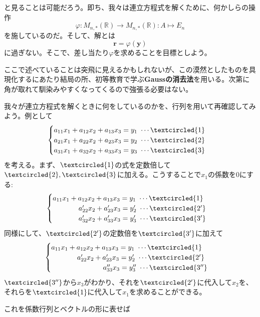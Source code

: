 \documentclass[dvipdfmx]{jsarticle}
\begin{document}
と見ることは可能だろう。即ち、我々は連立方程式を解くために、何かしらの操作
\[\varphi:M_{n,\ast}(\mathbb{R}) \to M_{n,\ast}(\mathbb{R}):A \mapsto E_n\]
を施しているのだ。そして、解とは
\[\bm{r}=\varphi(\bm{y})\]
に過ぎない。そこで、差し当たり$\varphi$を求めることを目標としよう。\par
ここで述べていることは突飛に見えるかもしれないが、この漠然としたものを具現化するにあたり結局の所、初等教育で学ぶ\textbf{Gaussの消去法}を用いる。次第に角が取れて馴染みやすくなってくるので強張る必要はない。\par
我々が連立方程式を解くときに何をしているのかを、行列を用いて再確認してみよう。例として
\[\begin{cases}a_{11}x_1+a_{12}x_2+a_{13}x_3=y_1~\cdots\textcircled{\scriptsize 1}\\a_{21}x_1+a_{22}x_2+a_{23}x_3=y_2~\cdots\textcircled{\scriptsize 2}\\a_{31}x_1+a_{32}x_2+a_{33}x_3=y_3~\cdots\textcircled{\scriptsize 3}\end{cases}\]
を考える。まず、$\textcircled{\scriptsize 1}$の式を定数倍して$\textcircled{\scriptsize 2},\textcircled{\scriptsize 3}$に加える。こうすることで$x_1$の係数を$0$にする:
\[\begin{cases}a_{11}x_1+a_{12}x_2+a_{13}x_3=y_1~\cdots\textcircled{\scriptsize 1}\\\hspace{3.7em}a'_{22}x_2+a'_{23}x_3=y'_2~\cdots\textcircled{\scriptsize 2'}\\\hspace{3.7em}a'_{32}x_2+a'_{33}x_3=y'_3~\cdots\textcircled{\scriptsize 3'}\end{cases}\]
同様にして、$\textcircled{\scriptsize 2'}$の定数倍を$\textcircled{\scriptsize 3'}$に加えて
\[\begin{cases}a_{11}x_1+a_{12}x_2+a_{13}x_3=y_1~\cdots\textcircled{\scriptsize 1}\\\hspace{3.7em}a'_{22}x_2+a'_{23}x_3=y'_2~\cdots\textcircled{\scriptsize 2'}\\\hspace{7.4em}a''_{33}x_3=y''_3~\cdots\textcircled{\scriptsize 3''}\end{cases}\]
$\textcircled{\scriptsize 3''}$から$x_3$がわかり、それを$\textcircled{\scriptsize 2'}$に代入して$x_2$を、それらを$\textcircled{\scriptsize 1}$に代入して$x_1$を求めることができる。\par
これを係数行列とベクトルの形に表せば
\end{document}
